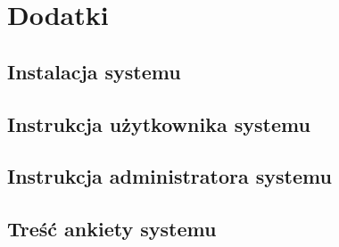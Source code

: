 \newpage\section{Dodatki} 
\subsection{Instalacja systemu \NazwaSys}
\subsection{Instrukcja użytkownika systemu \NazwaSys}
\subsection{Instrukcja administratora systemu \NazwaSys}
\subsection{Treść ankiety systemu \NazwaSys}
 

